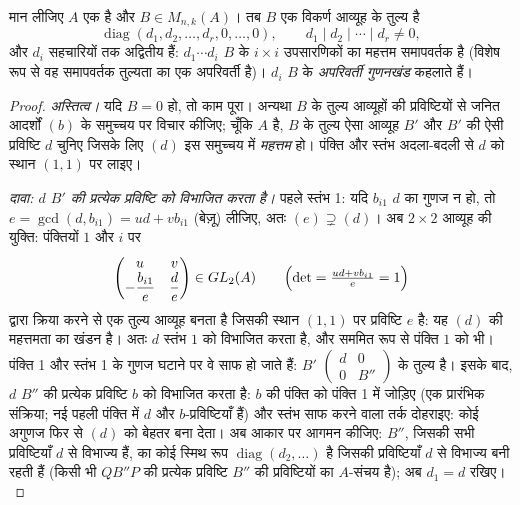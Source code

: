 \begin{theorem}[स्मिथ प्रसामान्य रूप]\label{thm:b3:modules:smith}
मान लीजिए $A$ एक  है और $B \in M_{n,k}(A)$। तब $B$ एक विकर्ण आव्यूह के
तुल्य है
\[
\operatorname{diag}(d_1, d_2, \dots, d_r, 0, \dots, 0),
\qquad d_1 \mid d_2 \mid \cdots \mid d_r \neq 0 ,
\]
और $d_i$ सहचारियों तक अद्वितीय हैं: $d_1 \cdots d_i$ $B$ के $i \times i$
उपसारणिकों का महत्तम समापवर्तक है (विशेष रूप से वह समापवर्तक
तुल्यता का एक अपरिवर्ती है)। $d_i$ $B$ के \emph{अपरिवर्ती
गुणनखंड} कहलाते हैं।
\end{theorem}

\begin{proof}
\emph{अस्तित्व।} यदि $B = 0$ हो, तो काम पूरा। अन्यथा $B$ के तुल्य
आव्यूहों की प्रविष्टियों से जनित आदर्शों $(b)$ के समुच्चय पर
विचार कीजिए; चूँकि $A$  है, $B$ के तुल्य ऐसा आव्यूह
$B'$ और $B'$ की ऐसी प्रविष्टि $d$ चुनिए जिसके लिए $(d)$ इस
समुच्चय में \emph{महत्तम} हो। पंक्ति और स्तंभ अदला-बदली से $d$
को स्थान $(1,1)$ पर लाइए।

\emph{दावा: $d$ $B'$ की प्रत्येक प्रविष्टि को विभाजित करता
है।} पहले स्तंभ 1: यदि $b_{i1}$ $d$ का गुणज न हो, तो $e = \gcd(d, b_{i1}) = ud +
vb_{i1}$
(बेज़ू) लीजिए, अतः $(e) \supsetneq (d)$। अब $2 \times 2$ आव्यूह की युक्ति: पंक्तियों
$1$ और $i$ पर
\[
\begin{pmatrix} u & v \\ -\dfrac{b_{i1}}e & \dfrac de
\end{pmatrix}
\in GL_2(A)
\qquad
\Bigl(\det = \tfrac{ud + v b_{i1}}e = 1\Bigr)
\]
द्वारा क्रिया करने से एक तुल्य आव्यूह बनता है जिसकी स्थान $(1,1)$
पर प्रविष्टि $e$ है: यह $(d)$ की महत्तमता का खंडन है। अतः
$d$ स्तंभ $1$ को विभाजित करता है, और सममित रूप से पंक्ति
$1$ को भी। पंक्ति 1 और स्तंभ 1 के गुणज घटाने पर वे साफ हो जाते
हैं: $B'$ $\begin{pmatrix} d &
0\\ 0 & B''\end{pmatrix}$ के तुल्य है। इसके बाद, $d$ $B''$ की प्रत्येक
प्रविष्टि $b$ को विभाजित करता है: $b$ की पंक्ति को पंक्ति 1
में जोड़िए (एक प्रारंभिक संक्रिया; नई पहली पंक्ति में $d$ और
$b$-प्रविष्टियाँ हैं) और स्तंभ साफ करने वाला तर्क दोहराइए: कोई
अगुणज फिर से $(d)$ को बेहतर बना देता। अब आकार पर आगमन कीजिए:
$B''$, जिसकी सभी प्रविष्टियाँ $d$ से विभाज्य हैं, का कोई
स्मिथ रूप $\operatorname{diag}(d_2,
\dots)$ है जिसकी प्रविष्टियाँ $d$ से विभाज्य बनी रहती
हैं (किसी भी $QB''P$ की प्रत्येक प्रविष्टि $B''$ की प्रविष्टियों
का $A$-संचय है); अब $d_1 =
d$ रखिए।


\end{proof}
